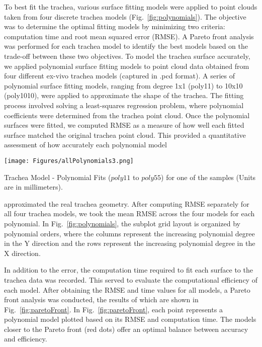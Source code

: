To best fit the trachea, various surface fitting models were applied to point clouds taken from four discrete trachea models (Fig.~\ref{fig:polynomials}). The objective  was to determine the optimal fitting models by minimizing two criteria: computation time and root mean squared error (RMSE). A Pareto front analysis was performed for each trachea model to identify the best models based on the trade-off between these two objectives. To model the trachea surface accurately, we applied polynomial surface fitting models to point cloud data obtained from four different ex-vivo trachea models (captured in .pcd format). A series of polynomial surface fitting models, ranging from degree 1x1 (poly11) to 10x10 (poly1010), were applied to approximate the shape of the trachea. The fitting process involved solving a least-squares regression problem, where polynomial coefficients were determined from the trachea point cloud. Once the polynomial surfaces were fitted, we computed RMSE as a measure of how well each fitted surface matched the original trachea point cloud. This provided a quantitative assessment of how accurately each polynomial model

\vspace{1em}
\begin{figurehere}
    \centering
    \texttt{[image: Figures/allPolynomials3.png]}
    \caption{Trachea Model - Polynomial Fits ($poly11$ to $poly55$) for one of the samples (Units are in millimeters).}
    \label{fig:polynomials}
\end{figurehere}



\noindent approximated the real trachea geometry. After computing RMSE separately for all four trachea models, we took the mean RMSE across the four models for each polynomial. In Fig.~\ref{fig:polynomials}, the subplot grid layout is organized by polynomial orders, where the columns represent the increasing polynomial degree in the Y direction and the rows represent the increasing polynomial degree in the X direction. 



In addition to the error, the computation time required to fit each surface to the trachea data was recorded. This served to evaluate the computational efficiency of each model. After obtaining the RMSE and time values for all models, a Pareto front analysis was conducted, the results of which are shown in Fig.~\ref{fig:paretoFront}. In Fig.~\ref{fig:paretoFront}, each point represents a polynomial model plotted based on its RMSE and computation time. The models closer to the Pareto front (red dots) offer an optimal balance between accuracy and efficiency.

